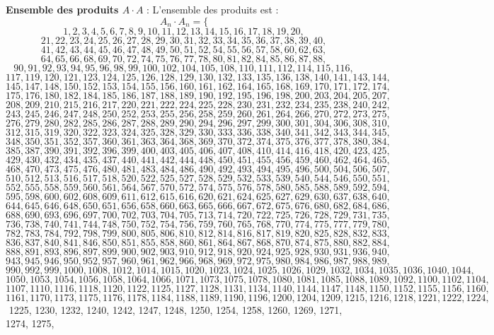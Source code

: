 \documentclass[11pt,a4paper]{article}
\begin{document}
\textbf{Ensemble des produits $A \cdot A$} :
L'ensemble des produits est :
$$ A_{{{n}}} \cdot A_{{{n}}} = \{ $$$$ 1, 2, 3, 4, 5, 6, 7, 8, 9, 10, 11, 12, 13, 14, 15, 16, 17, 18, 19, 20, $$$$ 21, 22, 23, 24, 25, 26, 27, 28, 29, 30, 31, 32, 33, 34, 35, 36, 37, 38, 39, 40, $$$$ 41, 42, 43, 44, 45, 46, 47, 48, 49, 50, 51, 52, 54, 55, 56, 57, 58, 60, 62, 63, $$$$ 64, 65, 66, 68, 69, 70, 72, 74, 75, 76, 77, 78, 80, 81, 82, 84, 85, 86, 87, 88, $$$$ 90, 91, 92, 93, 94, 95, 96, 98, 99, 100, 102, 104, 105, 108, 110, 111, 112, 114, 115, 116, $$$$ 117, 119, 120, 121, 123, 124, 125, 126, 128, 129, 130, 132, 133, 135, 136, 138, 140, 141, 143, 144, $$$$ 145, 147, 148, 150, 152, 153, 154, 155, 156, 160, 161, 162, 164, 165, 168, 169, 170, 171, 172, 174, $$$$ 175, 176, 180, 182, 184, 185, 186, 187, 188, 189, 190, 192, 195, 196, 198, 200, 203, 204, 205, 207, $$$$ 208, 209, 210, 215, 216, 217, 220, 221, 222, 224, 225, 228, 230, 231, 232, 234, 235, 238, 240, 242, $$$$ 243, 245, 246, 247, 248, 250, 252, 253, 255, 256, 258, 259, 260, 261, 264, 266, 270, 272, 273, 275, $$$$ 276, 279, 280, 282, 285, 286, 287, 288, 289, 290, 294, 296, 297, 299, 300, 301, 304, 306, 308, 310, $$$$ 312, 315, 319, 320, 322, 323, 324, 325, 328, 329, 330, 333, 336, 338, 340, 341, 342, 343, 344, 345, $$$$ 348, 350, 351, 352, 357, 360, 361, 363, 364, 368, 369, 370, 372, 374, 375, 376, 377, 378, 380, 384, $$$$ 385, 387, 390, 391, 392, 396, 399, 400, 403, 405, 406, 407, 408, 410, 414, 416, 418, 420, 423, 425, $$$$ 429, 430, 432, 434, 435, 437, 440, 441, 442, 444, 448, 450, 451, 455, 456, 459, 460, 462, 464, 465, $$$$ 468, 470, 473, 475, 476, 480, 481, 483, 484, 486, 490, 492, 493, 494, 495, 496, 500, 504, 506, 507, $$$$ 510, 512, 513, 516, 517, 518, 520, 522, 525, 527, 528, 529, 532, 533, 539, 540, 544, 546, 550, 551, $$$$ 552, 555, 558, 559, 560, 561, 564, 567, 570, 572, 574, 575, 576, 578, 580, 585, 588, 589, 592, 594, $$$$ 595, 598, 600, 602, 608, 609, 611, 612, 615, 616, 620, 621, 624, 625, 627, 629, 630, 637, 638, 640, $$$$ 644, 645, 646, 648, 650, 651, 656, 658, 660, 663, 665, 666, 667, 672, 675, 676, 680, 682, 684, 686, $$$$ 688, 690, 693, 696, 697, 700, 702, 703, 704, 705, 713, 714, 720, 722, 725, 726, 728, 729, 731, 735, $$$$ 736, 738, 740, 741, 744, 748, 750, 752, 754, 756, 759, 760, 765, 768, 770, 774, 775, 777, 779, 780, $$$$ 782, 783, 784, 792, 798, 799, 800, 805, 806, 810, 812, 814, 816, 817, 819, 820, 825, 828, 832, 833, $$$$ 836, 837, 840, 841, 846, 850, 851, 855, 858, 860, 861, 864, 867, 868, 870, 874, 875, 880, 882, 884, $$$$ 888, 891, 893, 896, 897, 899, 900, 902, 903, 910, 912, 918, 920, 924, 925, 928, 930, 931, 936, 940, $$$$ 943, 945, 946, 950, 952, 957, 960, 961, 962, 966, 968, 969, 972, 975, 980, 984, 986, 987, 988, 989, $$$$ 990, 992, 999, 1000, 1008, 1012, 1014, 1015, 1020, 1023, 1024, 1025, 1026, 1029, 1032, 1034, 1035, 1036, 1040, 1044, $$$$ 1050, 1053, 1054, 1056, 1058, 1064, 1066, 1071, 1073, 1075, 1078, 1080, 1081, 1085, 1088, 1089, 1092, 1100, 1102, 1104, $$$$ 1107, 1110, 1116, 1118, 1120, 1122, 1125, 1127, 1128, 1131, 1134, 1140, 1144, 1147, 1148, 1150, 1152, 1155, 1156, 1160, $$$$ 1161, 1170, 1173, 1175, 1176, 1178, 1184, 1188, 1189, 1190, 1196, 1200, 1204, 1209, 1215, 1216, 1218, 1221, 1222, 1224, $$$$ 1225, 1230, 1232, 1240, 1242, 1247, 1248, 1250, 1254, 1258, 1260, 1269, 1271, 1274, 1275, 
\end{document}
